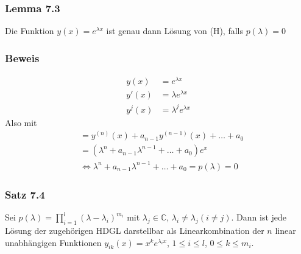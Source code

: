 \subsubsection*{Lemma 7.3}
Die Funktion $y(x)=e^{\lambda x}$ ist genau dann Lösung von (H), falls $p(\lambda)=0$
\subsubsection*{Beweis}
\begin{align*}
y(x)&=e^{\lambda x}\\
y'(x)&=\lambda e^{\lambda x}\\
y^j(x)&=\lambda ^je^{\lambda x}
\end{align*}
Also mit 
\begin{align*}
&=y^{(n)}(x)+a_{n-1}y^{(n-1)}(x)+\dots+a_0\\
&=(\lambda ^n+a_{n-1}\lambda ^{n-1}+\dots +a_0)e^x \\
&\Leftrightarrow \lambda^n+a_{n-1}\lambda^{n-1}+\dots +a_0=p(\lambda)=0
\end{align*}

\subsubsection*{Satz 7.4}
Sei $p(\lambda ) = \prod\limits_{i = 1}^l {{{(\lambda  - {\lambda _i})}^{{m_i}}}} $ mit $\lambda _j\in\mathbb{C}$, $\lambda_i\not=\lambda_j (i\not=j)$. Dann ist jede Lösung der zugehörigen HDGL darstellbar als Linearkombination der $n$ linear unabhängigen Funktionen $y_{ik}(x)=x^ke^{\lambda_ix}$, $1\leq i\leq l$, $0\leq k\leq m_i$.


